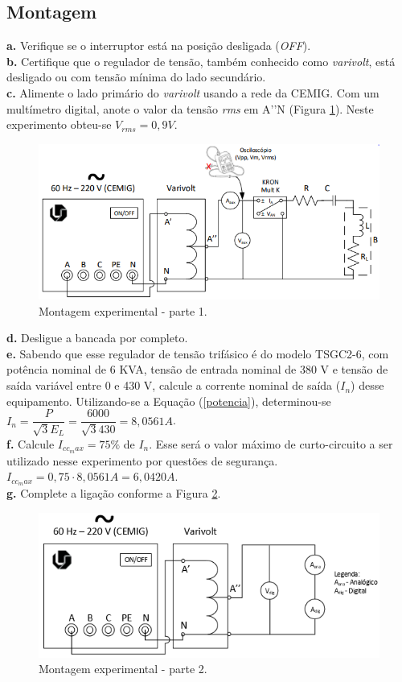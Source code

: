 \documentclass[a4paper,12pt,oneside,openany,table,xcdraw]{article}
\begin{document}
\subsection{Montagem} %
\noindent\textbf{a.} Verifique se o interruptor está na posição desligada (\textit{OFF}).\\
\textbf{b.} Certifique que o regulador de tensão, também conhecido como \textit{varivolt}, está desligado ou com tensão mínima do lado secundário.\\
\textbf{c.} Alimente o lado primário do \textit{varivolt} usando a rede da CEMIG. Com um multímetro digital, anote o valor da tensão \textit{rms} em A’’N (Figura \ref{fig1}). Neste experimento obteu-se $V_{rms}=0,9V$.\\
\begin{figure}[H]
\centering
\captionsetup{font=scriptsize}
\includegraphics[width=14.5cm]{fig1}
\caption{Montagem experimental - parte 1.}
\label{fig1}
\end{figure}
\noindent\textbf{d.} Desligue a bancada por completo.\\
\textbf{e.} Sabendo que esse regulador de tensão trifásico é do modelo TSGC2-6, com potência nominal de 6 KVA, tensão de entrada nominal de 380 V e tensão de saída variável entre 0 e 430 V, calcule a corrente nominal de saída ($I_n$) desse equipamento. Utilizando-se a Equação (\ref{potencia}), determinou-se $I_{n}=\dfrac{P}{\sqrt{3}E_L}=\dfrac{6000}{\sqrt{3}430}=8,0561A$.\\
\textbf{f.} Calcule $I_{cc_max} = 75\%$ de $I_n$. Esse será o valor máximo de curto-circuito a ser utilizado nesse experimento por questões de segurança. $I_{cc_max}=0,75\cdot 8,0561A=6,0420A$.\\
\textbf{g.} Complete a ligação conforme a Figura \ref{fig2}. \\
\begin{figure}[H]
\centering
\captionsetup{font=scriptsize}
\includegraphics[width=14.5cm]{fig2}
\caption{Montagem experimental - parte 2.}
\label{fig2}
\end{figure}
\end{document}
